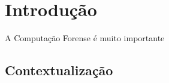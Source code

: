 \documentclass[cic,diss,portuguese]{infufrgs}
\begin{document}

\tableofcontents









\chapter{Introdução}
A Computação Forense é muito importante 
 
\section{Contextualização}
 
\end{document}
